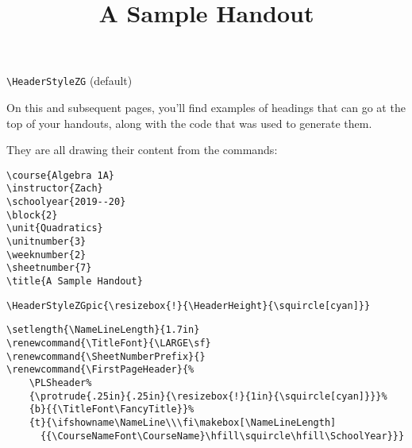 \documentclass[12pt,twoside,parskip,notitle,showframe]{handout}
\title{A Sample Handout}
\begin{document}
\begingroup
\HeaderStyleZG
\maketitle
\verb|\HeaderStyleZG| (default)
\endgroup

\vfill
On this and subsequent pages, you'll find examples of headings that can go at the top of your handouts, along with the code that was used to generate them.

They are all drawing their content from the commands:
\begingroup
\singlespacing
\begin{verbatim}
\course{Algebra 1A}
\instructor{Zach}
\schoolyear{2019--20}
\block{2}
\unit{Quadratics}
\unitnumber{3}
\weeknumber{2}
\sheetnumber{7}
\title{A Sample Handout}
\end{verbatim}
\endgroup

\newpage

\begingroup
\HeaderStyleZGpic{\resizebox{!}{\HeaderHeight}{\squircle[cyan]}}
\maketitle
\verb|\HeaderStyleZGpic{\resizebox{!}{\HeaderHeight}{\squircle[cyan]}}|
\endgroup

\newpage

\begingroup
\setlength{\NameLineLength}{1.7in}
\renewcommand{\TitleFont}{\LARGE\sf}
\renewcommand{\SheetNumberPrefix}{}
\renewcommand{\FirstPageHeader}{%
	\PLSheader%
	{\protrude{.25in}{.25in}{\resizebox{!}{1in}{\squircle[cyan]}}}%
	{b}{{\TitleFont\FancyTitle}}%
	{t}{\ifshowname\NameLine\\\fi\makebox[\NameLineLength]{{\CourseNameFont\CourseName}\hfill\squircle\hfill\SchoolYear}}}%
\maketitle
\singlespacing
\begin{verbatim}
\setlength{\NameLineLength}{1.7in}
\renewcommand{\TitleFont}{\LARGE\sf}
\renewcommand{\SheetNumberPrefix}{}
\renewcommand{\FirstPageHeader}{%
    \PLSheader%
    {\protrude{.25in}{.25in}{\resizebox{!}{1in}{\squircle[cyan]}}}%
    {b}{{\TitleFont\FancyTitle}}%
    {t}{\ifshowname\NameLine\\\fi\makebox[\NameLineLength]
      {{\CourseNameFont\CourseName}\hfill\squircle\hfill\SchoolYear}}}
\end{verbatim}
\endgroup

\newpage
\end{document}
